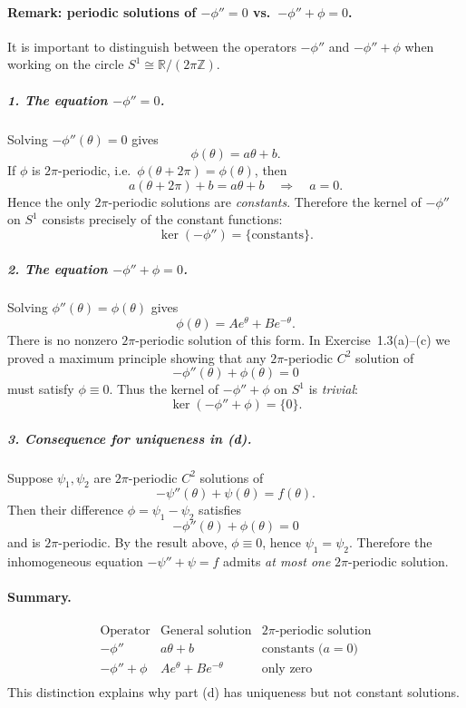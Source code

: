 \documentclass[12pt,a4paper]{article}
\theoremstyle{plain}
\theoremstyle{definition}
\theoremstyle{remark}
\theoremstyle{remark}
\begin{document}
\paragraph{Remark: periodic solutions of $-\phi''=0$ vs.\ $-\phi''+\phi=0$.}

It is important to distinguish between the operators $-\phi''$ and
$-\phi''+\phi$ when working on the circle $S^{1}\cong\mathbb{R}/(2\pi\mathbb{Z})$.

\subparagraph{1. The equation $-\phi''=0$.}
Solving $-\phi''(\theta)=0$ gives
\[
\phi(\theta) = a\theta + b.
\]
If $\phi$ is $2\pi$-periodic, i.e.\ $\phi(\theta+2\pi)=\phi(\theta)$, then
\[
a(\theta+2\pi)+b = a\theta + b
\quad\Longrightarrow\quad
a=0.
\]
Hence the only $2\pi$-periodic solutions are \emph{constants}.  Therefore
the kernel of $-\phi''$ on $S^1$ consists precisely of the constant
functions:
\[
\ker(-\phi'') = \{\text{constants}\}.
\]

\subparagraph{2. The equation $-\phi''+\phi=0$.}
Solving $\phi''(\theta)=\phi(\theta)$ gives
\[
\phi(\theta) = Ae^\theta + Be^{-\theta}.
\]
There is no nonzero $2\pi$-periodic solution of this form.  In
Exercise~1.3(a)--(c) we proved a maximum principle showing that any
$2\pi$-periodic $C^{2}$ solution of
\[
-\phi''(\theta) + \phi(\theta) = 0
\]
must satisfy $\phi\equiv 0$.  Thus the kernel of $-\phi''+\phi$ on $S^1$ is
\emph{trivial}:
\[
\ker(-\phi''+\phi) = \{0\}.
\]

\subparagraph{3. Consequence for uniqueness in (d).}
Suppose $\psi_{1},\psi_{2}$ are $2\pi$-periodic $C^{2}$ solutions of
\[
-\psi''(\theta)+\psi(\theta)=f(\theta).
\]
Then their difference $\phi=\psi_{1}-\psi_{2}$ satisfies
\[
-\phi''(\theta)+\phi(\theta)=0
\]
and is $2\pi$-periodic.  By the result above, $\phi\equiv 0$, hence
$\psi_{1}=\psi_{2}$.  Therefore the inhomogeneous equation
$-\psi''+\psi=f$ admits \emph{at most one} $2\pi$-periodic solution.

\paragraph{Summary.}
\[
\begin{array}{c|c|c}
	\text{Operator} & \text{General solution} & \text{$2\pi$-periodic solution} \\
	\hline
	-\phi'' & a\theta + b & \text{constants ($a=0$)} \\
	-\phi''+\phi & Ae^\theta + Be^{-\theta} & \text{only zero} \\
\end{array}
\]
This distinction explains why part (d) has uniqueness but not constant
solutions.
\end{document}
